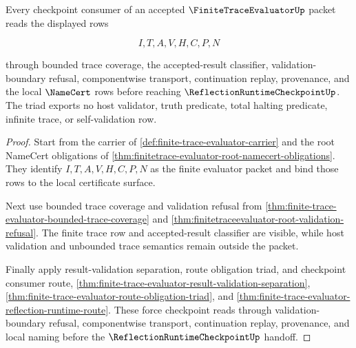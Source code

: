 \begin{theorem}
\label{thm:finite-trace-evaluator-checkpoint-runtime-namecert-triad}
Every checkpoint consumer of an accepted $\FiniteTraceEvaluatorUp$ packet reads the displayed rows

$$
I,T,A,V,H,C,P,N
$$

through bounded trace coverage, the accepted-result classifier, validation-boundary refusal, componentwise transport, continuation replay, provenance, and the local $\NameCert$ rows before reaching $\ReflectionRuntimeCheckpointUp$. The triad exports no host validator, truth predicate, total halting predicate, infinite trace, or self-validation row.
\end{theorem}
\begin{proof}
Start from the carrier of \autoref{def:finite-trace-evaluator-carrier} and the root NameCert obligations of \autoref{thm:finitetrace-evaluator-root-namecert-obligations}. They identify $I,T,A,V,H,C,P,N$ as the finite evaluator packet and bind those rows to the local certificate surface.

Next use bounded trace coverage and validation refusal from \autoref{thm:finite-trace-evaluator-bounded-trace-coverage} and \autoref{thm:finitetraceevaluator-root-validation-refusal}. The finite trace row and accepted-result classifier are visible, while host validation and unbounded trace semantics remain outside the packet.

Finally apply result-validation separation, route obligation triad, and checkpoint consumer route, \autoref{thm:finite-trace-evaluator-result-validation-separation}, \autoref{thm:finite-trace-evaluator-route-obligation-triad}, and \autoref{thm:finite-trace-evaluator-reflection-runtime-route}. These force checkpoint reads through validation-boundary refusal, componentwise transport, continuation replay, provenance, and local naming before the $\ReflectionRuntimeCheckpointUp$ handoff.
\end{proof}

